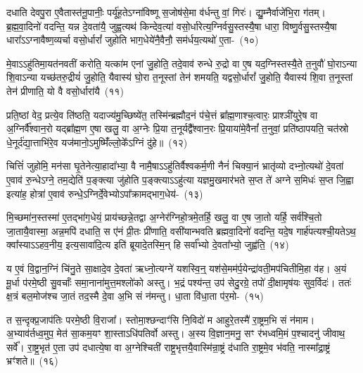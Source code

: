 दधाति देवपु॒रा ए॒वैतास्त॑नू॒पानीः॒ पर्यू॑ह॒ते\-ऽग्ना॑विष्णू स॒जोष॑से॒मा व॑र्धन्तु वां॒ गिरः॑। द्यु॒म्नैर्वाजे॑भि॒रा ग॑तम्। ब्र॒ह्म॒वा॒दिनो॑ वदन्ति॒ यन्न दे॒वता॑यै॒ जुह्व॒त्यथ॑ किन्देव॒त्या॑ वसो॒र्धारेत्य॒ग्निर्वसु॒स्तस्यै॒षा धारा॒ विष्णु॒र्वसु॒स्तस्यै॒षा धारा᳚\-ऽऽग्नावैष्ण॒व्यर्चा वसो॒र्धारां᳚ जुहोति भाग॒\-धेये॑नै॒वैनौ॒ सम॑र्धय॒त्यथो॑ ए॒ता-~(१०)\ip

मे॒वा\-ऽऽहु॑तिमा॒यत॑नवतीं करोति॒ यत्का॑म एनां जु॒होति॒ तदे॒वाव॑ रुन्धे रु॒द्रो वा ए॒ष यद॒ग्निस्तस्यै॒ते त॒नुवौ॑ घो॒रा\-ऽन्या शि॒वा\-ऽन्या यच्छ॑तरु॒द्रीयं॑ जु॒होति॒ यैवास्य॑ घो॒रा त॒नूस्तां तेन॑ शमयति॒ यद्वसो॒र्धारां᳚ जु॒होति॒ यैवास्य॑ शि॒वा त॒नूस्तां तेन॑ प्रीणाति॒ यो वै वसो॒र्धारा॑यै~(११)\ip

प्रति॒ष्ठां वेद॒ प्रत्ये॒व ति॑ष्ठति॒ यदाज्य॑मु॒च्छिष्ये॑त॒ तस्मि॑न्ब्रह्मौद॒नं प॑चे॒त्तं ब्रा᳚ह्म॒णाश्च॒त्वारः॒ प्राश्ञी॑युरे॒ष वा अ॒ग्निर्वै᳚श्वान॒रो यद्ब्रा᳚ह्म॒ण ए॒षा खलु॒ वा अ॒ग्नेः प्रि॒या त॒नूर्यद्वै᳚श्वान॒रः प्रि॒याया॑मे॒वैनां᳚ त॒नुवां॒ प्रति॑\-ष्ठापयति॒ चत॑स्रो धे॒नूर्द॑द्या॒त्ताभि॑रे॒व यज॑मानो॒\-ऽमुष्मिँ॑ल्लो॒के᳚\-ऽग्निं दु॑हे॥~(१२)\ip

{\anuvakamend[{उपै॒तान्धारा॑यै॒ षट्च॑त्वारिꣳशच्च}]}

चित्तिं॑ जुहोमि॒ मन॑सा घृ॒तेनेत्या॒हादा᳚भ्या॒ वै नामै॒षा\-ऽऽहु॑तिर्वैश्वकर्म॒णी नैनं॑ चिक्या॒नं भ्रातृ॑व्यो दभ्नो॒त्यथो॑ दे॒वता॑ ए॒वाव॑ रु॒न्धे\-ऽग्ने॒ तम॒द्येति॑ प॒ङ्क्त्या जु॑होति प॒ङ्क्त्या\-ऽऽहु॑त्या यज्ञमु॒खमार॑भते स॒प्त ते॑ अग्ने स॒मिधः॑ स॒प्त जि॒ह्वा इत्या॑ह॒ होत्रा॑ ए॒वाव॑ रुन्धे॒\-ऽग्निर्दे॒वेभ्यो\-ऽपा᳚क्रामद्भाग॒\-धेय॑-~(१३)\ip

मि॒च्छमा॑न॒स्तस्मा॑ ए॒तद्भा॑ग॒धेयं॒ प्राय॑च्छन्ने॒तद्वा अ॒ग्नेर॑ग्निहो॒त्रमे॒तर्\mbox{}हि॒ खलु॒ वा ए॒ष जा॒तो यर्\mbox{}हि॒ सर्व॑श्चि॒तो जा॒तायै॒वास्मा॒ अन्न॒मपि॑ दधाति॒ स ए॑नं प्री॒तः प्री॑णाति॒ वसी॑यान्भवति ब्रह्मवा॒दिनो॑ वदन्ति॒ यदे॒ष गार्\mbox{}ह॑पत्यश्ची॒यते\-ऽथ॒ क्वा᳚स्या\-ऽऽहव॒नीय॒ इत्य॒सावा॑दि॒त्य इति॑ ब्रूयादे॒तस्मि॒न् हि सर्वा᳚भ्यो दे॒वता᳚भ्यो॒ जुह्व॑ति॒~(१४)\ip

य ए॒वं वि॒द्वान॒ग्निं चि॑नु॒ते सा॒क्षादे॒व दे॒वता॑ ऋध्नो॒त्यग्ने॑ यशस्वि॒न्॒ यश॑से॒मम॑र्प॒येन्द्रा॑वती॒मप॑\-चितीमि॒हा व॑ह। अ॒यं मू॒र्धा प॑रमे॒ष्ठी सु॒वर्चाः᳚ समा॒नाना॑मुत्त॒मश्लो॑को अस्तु। भ॒द्रं पश्य॑न्त॒ उप॑ सेदु॒रग्रे॒ तपो॑ दी॒क्षामृष॑यः सुव॒र्विदः॑। ततः॑ क्ष॒त्रं बल॒मोज॑श्च जा॒तं तद॒स्मै दे॒वा अ॒भि सं न॑मन्तु। धा॒ता वि॑धा॒ता प॑र॒मो-~(१५)\ip

त स॒न्दृक्प्र॒जा\-प॑तिः परमे॒ष्ठी वि॒राजा᳚। स्तोमा॒श्छन्दाꣳ॑सि नि॒विदो॑ म आहुरे॒तस्मै॑ रा॒ष्ट्रम॒भि सं न॑माम। अ॒भ्याव॑र्तध्व॒मुप॒ मेत॑ सा॒कम॒यꣳ शा॒स्ता\-ऽधि॑\-पतिर्वो अस्तु। अ॒स्य वि॒ज्ञान॒मनु॒ सꣳ र॑भध्वमि॒मं प॒श्चादनु॑ जीवाथ॒ सर्वे᳚। रा॒ष्ट्र॒भृत॑ ए॒ता उप॑ दधात्ये॒षा वा अ॒ग्नेश्चिती॑ राष्ट्र॒भृत्तयै॒वास्मि॑न्रा॒ष्ट्रं द॑धाति रा॒ष्ट्रमे॒व भ॑वति॒ नास्मा᳚द्रा॒ष्ट्रं भ्रꣳ॑शते॥~(१६)\ip

